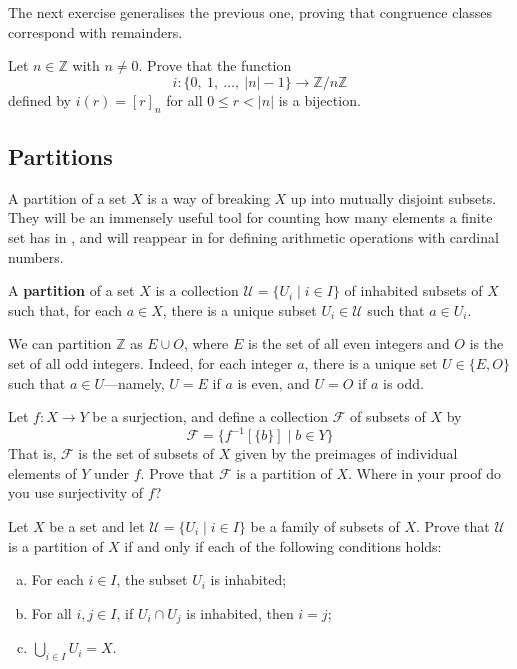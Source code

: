 The next exercise generalises the previous one, proving that congruence classes correspond with remainders.

\begin{exercise}
\label{exCongruenceClassesCorrespondWithRemainders}
Let $n \in \mathbb{Z}$ with $n \ne 0$. Prove that the function
\[ i : \{ 0,~ 1,~ \dots,~ |n|-1 \} \to \mathbb{Z}/n\mathbb{Z} \]
defined by $i(r) = [r]_n$ for all $0 \le r < |n|$ is a bijection.
\end{exercise}

\subsection*{Partitions}

A partition of a set $X$ is a way of breaking $X$ up into mutually disjoint subsets. They will be an immensely useful tool for counting how many elements a finite set has in , and will reappear in  for defining arithmetic operations with cardinal numbers.

\begin{definition}
\label{defPartition}
A \textbf{partition} of a set $X$ is a collection $\mathcal{U} = \{ U_i \mid i \in I \}$ of inhabited subsets of $X$ such that, for each $a \in X$, there is a unique subset $U_i \in \mathcal{U}$ such that $a \in U_i$.
\end{definition}

\begin{example}
We can partition $\mathbb{Z}$ as $E \cup O$, where $E$ is the set of all even integers and $O$ is the set of all odd integers. Indeed, for each integer $a$, there is a unique set $U \in \{ E, O \}$ such that $a \in U$---namely, $U=E$ if $a$ is even, and $U=O$ if $a$ is odd.
\end{example}

\begin{exercise}
\label{exPreimagesFormPartition}
Let $f : X \to Y$ be a surjection, and define a collection $\mathcal{F}$ of subsets of $X$ by
\[ \mathcal{F} = \{ f^{-1}[\{b\}] \mid b \in Y \} \]
That is, $\mathcal{F}$ is the set of subsets of $X$ given by the preimages of individual elements of $Y$ under $f$. Prove that $\mathcal{F}$ is a partition of $X$. Where in your proof do you use surjectivity of $f$?
\end{exercise}

\begin{exercise}
\label{exConditionsForPartition}
Let $X$ be a set and let $\mathcal{U} = \{ U_i \mid i \in I \}$ be a family of subsets of $X$. Prove that $\mathcal{U}$ is a partition of $X$ if and only if each of the following conditions holds:
\begin{enumerate}[(a)]
\item For each $i \in I$, the subset $U_i$ is inhabited;
\item For all $i,j \in I$, if $U_i \cap U_j$ is inhabited, then $i=j$;
\item $\bigcup_{i \in I} U_i = X$.
\end{enumerate}
\end{exercise}

